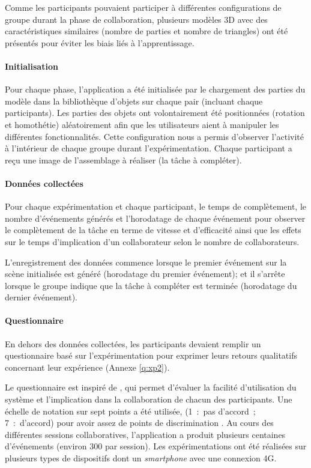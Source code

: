 Comme les participants pouvaient participer à différentes configurations de 
groupe durant la phase de collaboration, plusieurs modèles \gls{3D} avec des 
caractéristiques similaires (nombre de parties et nombre de triangles) ont été 
présentés pour éviter les biais liés à l'apprentissage.


\paragraph{Initialisation}

Pour chaque phase, l'application a été initialisée par le chargement des parties du 
modèle dans la bibliothèque d'objets sur chaque pair (incluant chaque participants). Les parties des 
objets ont volontairement été positionnées (rotation et homothétie) aléatoirement 
afin que les utilisateurs aient à manipuler les différentes fonctionnalités. Cette 
configuration nous a permis d'observer l'activité à l'intérieur de chaque groupe durant 
l'expérimentation. Chaque participant a reçu une image de l'assemblage à réaliser 
(la tâche à compléter). 

\paragraph{Données collectées}
Pour chaque expérimentation et chaque participant, le temps de complètement, le 
nombre d'événements générés et l'horodatage de chaque événement pour 
observer le complètement de la tâche en terme de vitesse et d'efficacité ainsi 
que les effets sur le temps d'implication d'un collaborateur selon le nombre de 
collaborateurs. 

L'enregistrement des données commence lorsque le premier événement sur la 
scène initialisée est généré (horodatage du premier événement); et il s'arrête 
lorsque le groupe indique que la tâche à compléter est terminée (horodatage du 
dernier événement).


\paragraph{Questionnaire}
En dehors des données collectées, les participants devaient remplir un 
questionnaire basé sur l'expérimentation pour exprimer leurs retours qualitatifs 
concernant leur expérience (Annexe \ref{q:xp2}). 

Le questionnaire est inspiré de \cite{Lewis1995}, qui permet d'évaluer la facilité 
d'utilisation du système et l'implication dans la collaboration de chacun des 
participants. Une échelle de notation sur sept points a été utilisée, 
(1~:~pas d'accord~; 7~:~d'accord) pour avoir assez de points de discrimination \cite{Lewis1993}.
Au cours des différentes sessions collaboratives, l'application a produit plusieurs 
centaines d'événements (environ 300 par session). Les expérimentations ont été 
réalisées sur plusieurs types de dispositifs dont un \textit{smartphone} avec une 
connexion 4G. 




